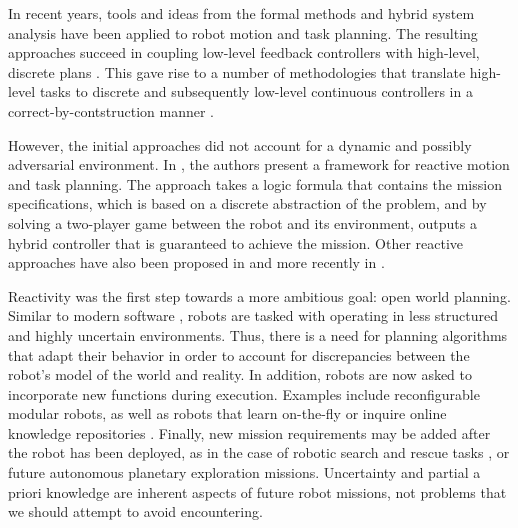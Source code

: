 In recent years, tools and ideas from the formal methods and hybrid system analysis have been applied to robot motion and task planning. The resulting approaches succeed in coupling low-level feedback controllers \cite{} with high-level, discrete plans \cite{}. This gave rise to a number of methodologies that translate high-level tasks to discrete and subsequently low-level continuous controllers in a correct-by-contstruction manner \cite{}.

However, the initial approaches did not account for a dynamic and possibly adversarial environment. In \cite{KGFP_TRO09}, the authors present a framework for reactive motion and task planning. The approach takes a logic formula that contains the mission specifications, which is based on a discrete abstraction of the problem, and by solving a two-player game between the robot and its environment, outputs a hybrid controller that is guaranteed to achieve the mission. Other reactive approaches have also been proposed in \cite{Wongpiromsarn2010} and more recently in \cite{Belta2013RSS}.

Reactivity was the first step towards a more ambitious goal: open world planning. Similar to modern software \cite{open-world-sw}, robots are tasked with operating in less structured and highly uncertain environments. Thus, there is a need for planning algorithms that adapt their behavior in order to account for discrepancies between the robot's model of the world and reality. In addition, robots are now asked to incorporate new functions during execution. Examples include reconfigurable modular robots, as well as robots that learn on-the-fly \cite{SaxenaIJRR2012} or inquire online knowledge repositories \cite{rapyuta2013}. Finally, new mission requirements may be added after the robot has been deployed, as in the case of robotic search and rescue tasks \cite{MatthiasAI2010}, or future autonomous planetary exploration missions. Uncertainty and partial a priori knowledge are inherent aspects of future robot missions, not problems that we should attempt to avoid encountering.

